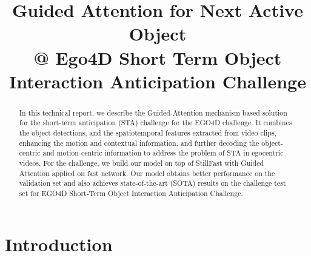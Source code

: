 \documentclass[10pt,twocolumn,letterpaper]{article}
\begin{document}
\title{Guided Attention for Next Active Object \\ @ Ego4D Short Term Object Interaction Anticipation Challenge }



\address{\textsuperscript{1} Pattern Analysis and Computer Vision, Istituto Italiano di Tecnologia, Genoa, Italy \\
\textsuperscript{2} University of Trento, Trento, Italy \\
\textsuperscript{3} University of Verona, Verona, Italy \\
\textsuperscript{4} DITEN, University of Genoa, Genoa, Italy \\  \hline
\\
\textbf{\{sanket.thakur, pietro.morerio, vittorio.murino, alessio.delbue\}@iit.it, cigdem.beyan@unitn.it}} 

\maketitle
\thispagestyle{empty}




\begin{abstract}
In this technical report, we describe the Guided-Attention mechanism \cite{gano} based solution for the short-term anticipation (STA) challenge for the EGO4D challenge. It combines the object detections, and the spatiotemporal features extracted from video clips, enhancing the motion and contextual information, and further decoding the object-centric and motion-centric information to address the problem of STA in egocentric videos. For the challenge, we build our model on top of StillFast \cite{ragusa2023stillfast} with Guided Attention applied on fast network. Our model obtains better performance on the validation set and also achieves state-of-the-art (SOTA) results on the challenge test set for EGO4D Short-Term Object Interaction Anticipation Challenge.
\end{abstract}


\section{Introduction}
\label{sec:intro}
\end{document}
